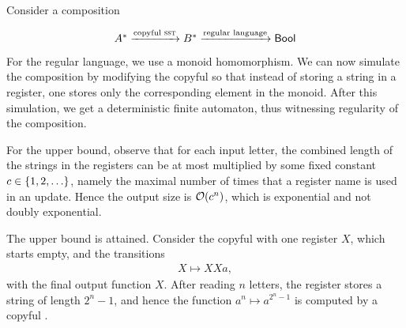 
 { 
Consider a composition 
\[
\begin{tikzcd}
A^* \xrightarrow {\text{copyful \sst}} B^* \xrightarrow{\text{regular language}} \Bool
\end{tikzcd}
\]
For the regular language, we use a monoid homomorphism. We can now simulate the composition by modifying the  copyful \sst so that instead of storing a string in a register, one stores only  the corresponding element in the monoid. After this simulation, we get a deterministic finite automaton, thus witnessing regularity of the composition.
 }


   {
For the upper bound, observe that for each input letter, the combined length of the strings in the registers can be at most multiplied by some fixed constant $c \in \{1,2,\ldots\}$, namely the maximal number of times that a register name is used in an update. Hence the output size is ${\mathcal O}(c^n)$, which is exponential and not doubly exponential.

The upper bound is attained. Consider the copyful \sst with one register $X$, which starts empty, and the transitions
\begin{align*}
X \mapsto XXa,
\end{align*}
with the final output function $X$. After reading $n$ letters, the register stores a string of length $2^n - 1$, and hence the function $a^n \mapsto a^{2^n-1}$ is computed by a copyful \sst.
}

